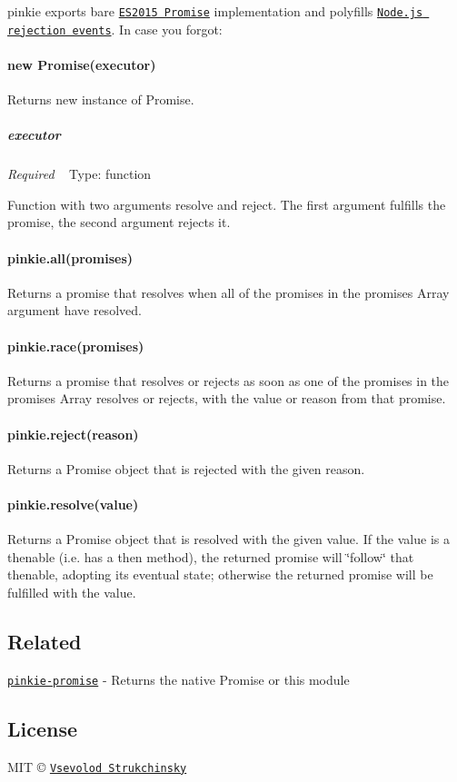 {\ttfamily pinkie} exports bare \href{https://people.mozilla.org/~jorendorff/es6-draft.html#sec-promise-objects}{\tt E\+S2015 Promise} implementation and polyfills \href{https://nodejs.org/api/process.html#process_event_unhandledrejection}{\tt Node.\+js rejection events}. In case you forgot\+:

\paragraph*{new Promise(executor)}

Returns new instance of {\ttfamily Promise}.

\subparagraph*{executor}

{\itshape Required} ~\newline
Type\+: {\ttfamily function}

Function with two arguments {\ttfamily resolve} and {\ttfamily reject}. The first argument fulfills the promise, the second argument rejects it.

\paragraph*{pinkie.\+all(promises)}

Returns a promise that resolves when all of the promises in the {\ttfamily promises} Array argument have resolved.

\paragraph*{pinkie.\+race(promises)}

Returns a promise that resolves or rejects as soon as one of the promises in the {\ttfamily promises} Array resolves or rejects, with the value or reason from that promise.

\paragraph*{pinkie.\+reject(reason)}

Returns a Promise object that is rejected with the given {\ttfamily reason}.

\paragraph*{pinkie.\+resolve(value)}

Returns a Promise object that is resolved with the given {\ttfamily value}. If the {\ttfamily value} is a thenable (i.\+e. has a then method), the returned promise will \char`\"{}follow\char`\"{} that thenable, adopting its eventual state; otherwise the returned promise will be fulfilled with the {\ttfamily value}.

\subsection*{Related}


\begin{DoxyItemize}
\item \href{https://github.com/floatdrop/pinkie-promise}{\tt pinkie-\/promise} -\/ Returns the native Promise or this module
\end{DoxyItemize}

\subsection*{License}

M\+IT © \href{http://github.com/floatdrop}{\tt Vsevolod Strukchinsky} 